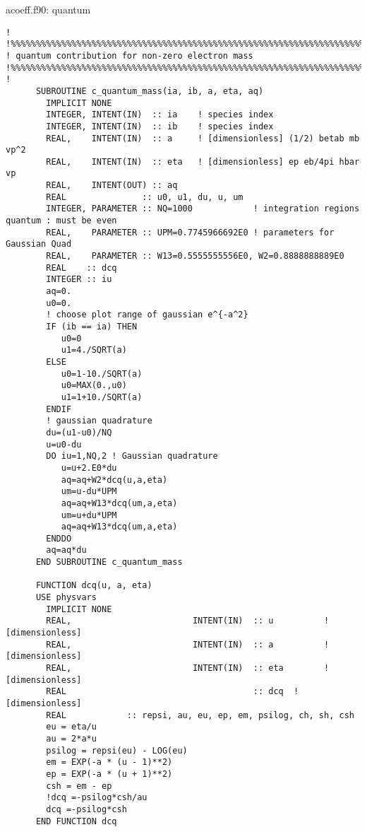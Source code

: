 \documentclass[preprint,12pt,eqsecnum,nofootinbib,amsmath,amssymb]{revtex4}
\begin{document}
{{\vskip1cm 
\noindent
acoeff.f90: quantum
{
\baselineskip 10pt
\begin{verbatim}
!
!%%%%%%%%%%%%%%%%%%%%%%%%%%%%%%%%%%%%%%%%%%%%%%%%%%%%%%%%%%%%%%%%%%%%%%%
! quantum contribution for non-zero electron mass
!%%%%%%%%%%%%%%%%%%%%%%%%%%%%%%%%%%%%%%%%%%%%%%%%%%%%%%%%%%%%%%%%%%%%%%%
!
      SUBROUTINE c_quantum_mass(ia, ib, a, eta, aq)
        IMPLICIT NONE
        INTEGER, INTENT(IN)  :: ia    ! species index
        INTEGER, INTENT(IN)  :: ib    ! species index
        REAL,    INTENT(IN)  :: a     ! [dimensionless] (1/2) betab mb vp^2
        REAL,    INTENT(IN)  :: eta   ! [dimensionless] ep eb/4pi hbar vp
        REAL,    INTENT(OUT) :: aq 
        REAL               :: u0, u1, du, u, um
        INTEGER, PARAMETER :: NQ=1000            ! integration regions quantum : must be even
        REAL,    PARAMETER :: UPM=0.7745966692E0 ! parameters for Gaussian Quad
        REAL,    PARAMETER :: W13=0.5555555556E0, W2=0.8888888889E0
        REAL    :: dcq
        INTEGER :: iu
        aq=0.
        u0=0.
        ! choose plot range of gaussian e^{-a^2}
        IF (ib == ia) THEN
           u0=0
           u1=4./SQRT(a)
        ELSE
           u0=1-10./SQRT(a)
           u0=MAX(0.,u0)  
           u1=1+10./SQRT(a)
        ENDIF
        ! gaussian quadrature
        du=(u1-u0)/NQ
        u=u0-du
        DO iu=1,NQ,2 ! Gaussian quadrature
           u=u+2.E0*du
           aq=aq+W2*dcq(u,a,eta)
           um=u-du*UPM
           aq=aq+W13*dcq(um,a,eta)
           um=u+du*UPM
           aq=aq+W13*dcq(um,a,eta)
        ENDDO
        aq=aq*du
      END SUBROUTINE c_quantum_mass

      FUNCTION dcq(u, a, eta)
      USE physvars
        IMPLICIT NONE
        REAL,                        INTENT(IN)  :: u          ! [dimensionless]
        REAL,                        INTENT(IN)  :: a          ! [dimensionless]
        REAL,                        INTENT(IN)  :: eta        ! [dimensionless]
        REAL                                     :: dcq  ! [dimensionless]
        REAL            :: repsi, au, eu, ep, em, psilog, ch, sh, csh
        eu = eta/u
        au = 2*a*u
        psilog = repsi(eu) - LOG(eu)
        em = EXP(-a * (u - 1)**2)
        ep = EXP(-a * (u + 1)**2)
        csh = em - ep
        !dcq =-psilog*csh/au
        dcq =-psilog*csh
      END FUNCTION dcq
\end{verbatim}
}






\pagebreak
\appendix



}}
\end{document}

